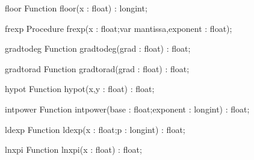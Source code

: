 \FPCexample{}


\begin{function}{floor}
\Declaration
Function floor(x : float) : longint;
\Description

\Errors
\SeeAlso
\end{function}

\FPCexample{}


\begin{procedure}{frexp}
\Declaration
Procedure frexp(x : float;var mantissa,exponent : float);
\Description

\Errors
\SeeAlso
\end{procedure}

\FPCexample{}


\begin{function}{gradtodeg}
\Declaration
Function gradtodeg(grad : float) : float;
\Description

\Errors
\SeeAlso
\end{function}

\FPCexample{}


\begin{function}{gradtorad}
\Declaration
Function gradtorad(grad : float) : float;
\Description

\Errors
\SeeAlso
\end{function}

\FPCexample{}


\begin{function}{hypot}
\Declaration
Function hypot(x,y : float) : float;
\Description

\Errors
\SeeAlso
\end{function}

\FPCexample{}


\begin{function}{intpower}
\Declaration
Function intpower(base : float;exponent : longint) : float;
\Description

\Errors
\SeeAlso
\end{function}

\FPCexample{}


\begin{function}{ldexp}
\Declaration
Function ldexp(x : float;p : longint) : float;
\Description

\Errors
\SeeAlso
\end{function}

\FPCexample{}


\begin{function}{lnxpi}
\Declaration
Function lnxpi(x : float) : float;
\Description

\Errors
\SeeAlso
\end{function}

